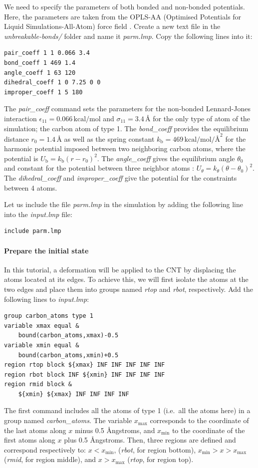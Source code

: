 \documentclass[9pt,tutorial]{livecoms}
\begin{document}
We need to specify the parameters of both bonded and non-bonded potentials.
Here, the parameters are taken from the OPLS-AA (Optimised Potentials for
Liquid Simulations-All-Atom) force field \cite{jorgensenDevelopmentTestingOPLS1996}.
Create a new text file in the \textit{unbreakable-bonds/} folder and name
it \textit{parm.lmp}. Copy the following lines into it:
{\normalsize \begin{verbatim}
pair_coeff 1 1 0.066 3.4
bond_coeff 1 469 1.4
angle_coeff 1 63 120
dihedral_coeff 1 0 7.25 0 0
improper_coeff 1 5 180
\end{verbatim}}
The \textit{pair\_coeff} command sets the parameters for the non-bonded
Lennard-Jones interaction $\epsilon_{11} = 0.066 \, \text{kcal/mol}$ and
$\sigma_{11} = 3.4 \, \text{\AA{}}$ for the only type of atom of the simulation;
the carbon atom of type 1.  The \textit{bond\_coeff} provides the equilibrium
distance $r_0= 1.4 \, \text{\AA{}}$ as well as the spring constant
$k_\text{b} = 469 \, \text{kcal/mol/\AA{}}^2$ for the harmonic potential imposed
between two neighboring carbon atoms, where the potential is
$U_\text{b} = k_\text{b} ( r - r_0)^2$. The
\textit{angle\_coeff} gives the equilibrium angle $\theta_0$ and constant for
the potential between three neighbor atoms :
$U_\theta = k_\theta ( \theta - \theta_0)^2$. The \textit{dihedral\_coeff}
and \textit{improper\_coeff} give the potential for the constraints between 4
atoms.

Let us include the file \textit{parm.lmp} in the simulation by adding
the following line into the \textit{input.lmp} file:
{\normalsize \begin{verbatim}
include parm.lmp
\end{verbatim}}

\paragraph{Prepare the initial state}

In this tutorial, a deformation will be applied to the CNT by displacing
the atoms located at its edges. To achieve this, we will first isolate the
atoms at the two edges and place them into groups named \textit{rtop} and
\textit{rbot}, respectively. Add the following lines to \textit{input.lmp}:
{\normalsize \begin{verbatim}
group carbon_atoms type 1
variable xmax equal &
    bound(carbon_atoms,xmax)-0.5
variable xmin equal &
    bound(carbon_atoms,xmin)+0.5
region rtop block ${xmax} INF INF INF INF INF
region rbot block INF ${xmin} INF INF INF INF
region rmid block &
    ${xmin} ${xmax} INF INF INF INF
\end{verbatim}}
The first command includes all the atoms of type 1 (i.e.~all the atoms here)
in a group named \textit{carbon\_atoms}.
The variable $x_\text{max}$ corresponds to the coordinate of the
last atoms along $x$ minus 0.5 Ångstroms, and $x_\text{min}$ to the coordinate
of the first atoms along $x$ plus 0.5 Ångstroms. Then, three regions are defined
and correspond respectively to: $x < x_\text{min}$, (\textit{rbot}, for region
bottom), $x_\text{min} > x > x_\text{max}$ (\textit{rmid}, for region middle),
and $x > x_\text{max}$ (\textit{rtop}, for region top).
\end{document}
